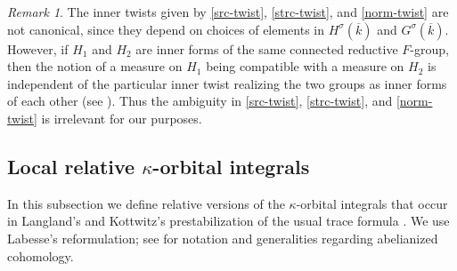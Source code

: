 \documentclass[12pt]{amsart}
\theoremstyle{remark}
\newtheorem*{rem}{Remark}
\numberwithin{equation}{section}
\theoremstyle{definition}
\renewcommand{\bar}{\overline}
\numberwithin{equation}{subsection}
\begin{document}
\begin{rem} The inner twists given by \eqref{src-twist}, \eqref{strc-twist},
and \eqref{norm-twist} are not canonical, since they depend on choices of
elements in $H^{\sigma}(\bar{k})$ and $G^{\sigma}(\bar{k})$.  However, if $H_1$ and $H_2$  are
inner forms of the same connected reductive $F$-group, then the notion of a measure on
$H_1$ being compatible with a measure on $H_2$ is independent of the particular inner
twist realizing the two groups as inner forms of each other (see \cite[p.~631]{KottTama}).
Thus the ambiguity in \eqref{src-twist}, \eqref{strc-twist}, and \eqref{norm-twist} is irrelevant for our purposes.
\end{rem}

\subsection{Local relative $\kappa$-orbital integrals} \label{ssec-lroi}

In this subsection we define relative versions of the $\kappa$-orbital integrals that occur in
Langland's and Kottwitz's prestabilization of the usual trace
formula \cite{KottEllSing}.   We  use Labesse's reformulation; see
\cite{Lab} for notation and generalities regarding abelianized cohomology.
\end{document}
